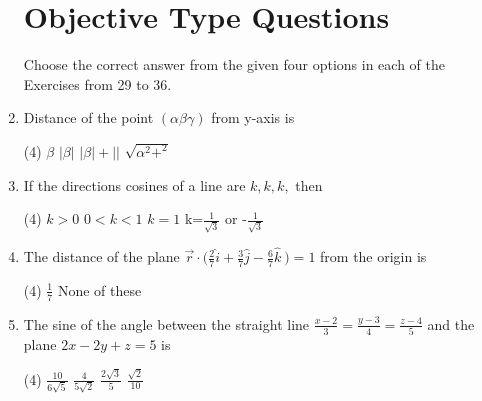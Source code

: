 \documentclass[12pt]{article}
\begin{document}
\begin{enumerate}
\section*{Objective Type Questions}
Choose the correct answer from the given four options in each of the Exercises from 29 to 36.

\item Distance of the point $(\alpha \beta \gamma)$ from y-axis is
\begin{tasks}(4)
	\task $\beta$ 
	\task $|\beta|$
	\task $|\beta|+||$
	\task $\sqrt{\alpha^2+ ^2}$
\end{tasks}
\item If the directions cosines of a line are $k,k,k,$ then
\begin{tasks}(4)
	\task $k>0$
	\task $0<k<1$
	\task $k=1$
	\task k=\(\displaystyle \frac{1}{\sqrt{3}}\) or -\(\displaystyle \frac{1}{\sqrt{3}}\)
\end{tasks}
\item The distance of the plane $\overrightarrow{r} \cdot \Biggl(\displaystyle \frac{2}{7}\hat{i}+\frac{3}{7}\hat{j}-\frac{6}{7}\hat{k}\ \Biggr)=1$ from the origin is 
\begin{tasks}(4)
	\task \(\displaystyle \frac{1}{7}\)
	\task None of these	
\end{tasks}
\item The sine of the angle between the straight line \(\displaystyle \frac{x-2}{3}=\frac{y-3}{4}=\frac{z-4}{5}\) and the plane $2x-2y+z=5$ is
\begin{tasks}(4)
	\task \(\displaystyle \frac{10}{6\sqrt{5}}\)
	\task \(\displaystyle \frac{4}{5\sqrt{2}}\)
	\task \(\displaystyle \frac{2\sqrt{3}}{5}\)
	\task \(\displaystyle \frac{\sqrt{2}}{10}\)


\end{tasks}
\end{enumerate}
\end{document}
